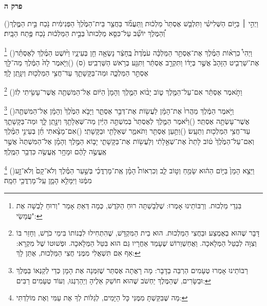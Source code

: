 \documentclass[12pt, openany]{book}
\newcommand{\chapname}{}
\newcommand{\newchap}[1]{
	\addcontentsline{toc}{chapter}{#1}
	\renewcommand{\chapname}{#1}
		\begin{center}
			\textbf{%
\fontsize{16pt}{16pt}\selectfont
				#1}
		\end{center}
}
\newcommand{\footnotecomment}[1]{
	\renewcommand\thefootnote{}
	\footnote{\textsf{#1}}}
\newcommand{\commenta}[1]{\footnotecomment{#1}\hspace{0em}}
\newcommand{\vsnum}[1]{(\hebrewnumeral{#1})\space}
\begin{document}
\newchap{פרק ה}
\begin{multicols}{2}
\vsnum{1}וַיְהִ֣י ׀ בַּיּ֣וֹם הַשְּׁלִישִׁ֗י וַתִּלְבַּ֤שׁ אֶסְתֵּר֙ מַלְכ֔וּת וַֽתַּעֲמֹ֞ד בַּחֲצַ֤ר בֵּית־הַמֶּ֙לֶךְ֙ הַפְּנִימִ֔ית נֹ֖כַח בֵּ֣ית הַמֶּ֑לֶךְ וְ֠הַמֶּלֶךְ יוֹשֵׁ֞ב עַל־כִּסֵּ֤א מַלְכוּתוֹ֙ בְּבֵ֣ית הַמַּלְכ֔וּת נֹ֖כַח פֶּ֥תַח הַבָּֽיִת׃%
\commenta{ בִּגְדֵי מַלְכוּת. וְרַבּוֹתֵינוּ אָמְרוּ: שֶׁלְּבָשַׁתָּה רוּחַ הַקֹּדֶשׁ, כְּמָה דְּאַתְּ אָמַר "וְרוּחַ לָבְשָׁה אֶת עֲמָשַׂי": }%
\vsnum{2}וַיְהִי֩ כִרְא֨וֹת הַמֶּ֜לֶךְ אֶת־אֶסְתֵּ֣ר הַמַּלְכָּ֗ה עֹמֶ֙דֶת֙ בֶּֽחָצֵ֔ר נָשְׂאָ֥ה חֵ֖ן בְּעֵינָ֑יו וַיּ֨וֹשֶׁט הַמֶּ֜לֶךְ לְאֶסְתֵּ֗ר אֶת־שַׁרְבִ֤יט הַזָּהָב֙ אֲשֶׁ֣ר בְּיָד֔וֹ וַתִּקְרַ֣ב אֶסְתֵּ֔ר וַתִּגַּ֖ע בְּרֹ֥אשׁ הַשַּׁרְבִֽיט׃ (ס)
\vsnum{3}וַיֹּ֤אמֶר לָהּ֙ הַמֶּ֔לֶךְ מַה־לָּ֖ךְ אֶסְתֵּ֣ר הַמַּלְכָּ֑ה וּמַה־בַּקָּשָׁתֵ֛ךְ עַד־חֲצִ֥י הַמַּלְכ֖וּת וְיִנָּ֥תֵֽן לָֽךְ׃%
\commenta{ דָּבָר שֶׁהוּא בְאֶמְצַע וּבַחֲצִי הַמַּלְכוּת. הוּא בֵית הַמִּקְדָּשׁ, שֶׁהִתְחִילוּ לִבְנוֹתוֹ בִּימֵי כֹרֶשׁ, וְחָזַר בּוֹ וְצִוָּה לְבַטֵּל הַמְּלָאכָה. וַאֲחַשְׁוֵרוֹשׁ שֶׁעָמַד אַחֲרָיו גַּם הוּא בִּטֵּל הַמְּלָאכָה. וּפְשׁוּטוֹ שֶׁל מִקְרָא: אַף אִם תִּשְׁאֲלִי מִמֶּנִּי חֲצִי הַמַּלְכוּת, אֶתֵּן לָךְ: }%
\vsnum{4}וַתֹּ֣אמֶר אֶסְתֵּ֔ר אִם־עַל־הַמֶּ֖לֶךְ ט֑וֹב יָב֨וֹא הַמֶּ֤לֶךְ וְהָמָן֙ הַיּ֔וֹם אֶל־הַמִּשְׁתֶּ֖ה אֲשֶׁר־עָשִׂ֥יתִי לֽוֹ׃%
\commenta{ רַבּוֹתֵינוּ אָמְרוּ טְעָמִים הַרְבֵּה בַדָּבָר: מָה רָאֲתָה אֶסְתֵּר שֶׁזִּמְּנָה אֶת הָמָן כְּדֵי לְקַנְאוֹ בַּמֶּלֶךְ וּבַשָּׂרִים, שֶׁהַמֶּלֶךְ יַחְשֹׁב שֶׁהוּא חוֹשֵׁק אֵלֶיהָ וְיַהַרְגֶנּוּ, וְעוֹד טְעָמִים רַבִּים: }%
\vsnum{5}וַיֹּ֣אמֶר הַמֶּ֔לֶךְ מַהֲרוּ֙ אֶת־הָמָ֔ן לַעֲשׂ֖וֹת אֶת־דְּבַ֣ר אֶסְתֵּ֑ר וַיָּבֹ֤א הַמֶּ֙לֶךְ֙ וְהָמָ֔ן אֶל־הַמִּשְׁתֶּ֖ה אֲשֶׁר־עָשְׂתָ֥ה אֶסְתֵּֽר׃
\vsnum{6}וַיֹּ֨אמֶר הַמֶּ֤לֶךְ לְאֶסְתֵּר֙ בְּמִשְׁתֵּ֣ה הַיַּ֔יִן מַה־שְּׁאֵלָתֵ֖ךְ וְיִנָּ֣תֵֽן לָ֑ךְ וּמַה־בַּקָּשָׁתֵ֛ךְ עַד־חֲצִ֥י הַמַּלְכ֖וּת וְתֵעָֽשׂ׃
\vsnum{7}וַתַּ֥עַן אֶסְתֵּ֖ר וַתֹּאמַ֑ר שְׁאֵלָתִ֖י וּבַקָּשָׁתִֽי׃
\vsnum{8}אִם־מָצָ֨אתִי חֵ֜ן בְּעֵינֵ֣י הַמֶּ֗לֶךְ וְאִם־עַל־הַמֶּ֙לֶךְ֙ ט֔וֹב לָתֵת֙ אֶת־שְׁאֵ֣לָתִ֔י וְלַעֲשׂ֖וֹת אֶת־בַּקָּשָׁתִ֑י יָב֧וֹא הַמֶּ֣לֶךְ וְהָמָ֗ן אֶל־הַמִּשְׁתֶּה֙ אֲשֶׁ֣ר אֶֽעֱשֶׂ֣ה לָהֶ֔ם וּמָחָ֥ר אֶֽעֱשֶׂ֖ה כִּדְבַ֥ר הַמֶּֽלֶךְ׃%
\commenta{ מַה שֶּׁבִּקַּשְׁתָּ מִמֶּנִּי כָּל הַיָּמִים, לְגַלּוֹת לְךָ אֶת עַמִּי וְאֶת מוֹלַדְתִּי: }%
\vsnum{9}וַיֵּצֵ֤א הָמָן֙ בַּיּ֣וֹם הַה֔וּא שָׂמֵ֖חַ וְט֣וֹב לֵ֑ב וְכִרְאוֹת֩ הָמָ֨ן אֶֽת־מָרְדֳּכַ֜י בְּשַׁ֣עַר הַמֶּ֗לֶךְ וְלֹא־קָם֙ וְלֹא־זָ֣ע מִמֶּ֔נּוּ וַיִּמָּלֵ֥א הָמָ֛ן עַֽל־מָרְדֳּכַ֖י חֵמָֽה׃

\end{multicols}
\end{document}
